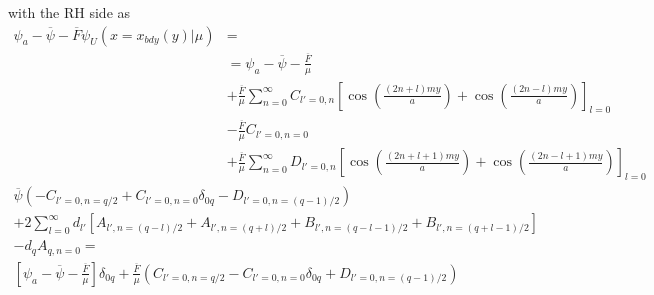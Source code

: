 \documentclass{article}
\begin{document}
with the RH side as
\begin{equation}
    \begin{split}
        \psi_a -\overline{\psi} -\overline{F}\psi_U(x=x_{bdy}(y)|\mu)&= \\
                                                                     &= \psi_a - \overline{\psi} - \frac{\overline{F}}{\mu} \\
                                                                     &+ \frac{\overline{F}}{\mu} \sum_{n=0}^{\infty} C_{l'=0,n} \left[\cos\left( \frac{(2n+l)my}{a} \right) + \cos\left( \frac{(2n-l)my}{a} \right) \right]_{l=0} \\
                                                                     &- \frac{\overline{F}}{\mu} C_{l'=0,n=0} \\
                                                                     &+ \frac{\overline{F}}{\mu} \sum_{n=0}^{\infty} D_{l'=0,n} \left[\cos\left( \frac{(2n+l+1)my}{a} \right) + \cos\left( \frac{(2n-l+1)my}{a} \right) \right]_{l=0}
    \end{split}
\end{equation} 
\begin{equation}
    \begin{split}
        \overline{\psi}\left( -C_{l'=0,n=q / 2} + C_{l'=0,n=0} \delta_{0q} - D_{l'=0,n=(q-1) / 2} \right) \\
        +2 \sum_{l=0}^{\infty} d_{l'} \left[ A_{l',n=(q-l) / 2} + A_{l',n=(q+l) / 2} + B_{l',n=(q-l-1) / 2} + B_{l',n=(q+l-1) / 2} \right] \\
        -d_q A_{q,n=0} = \\
        \left[ \psi_a - \overline{\psi} - \frac{\overline{F}}{\mu} \right] \delta_{0q} + \frac{\overline{F}}{\mu}\left(C_{l'=0,n=q / 2} - C_{l'=0,n=0} \delta_{0q} + D_{l'=0,n=(q-1) / 2}\right) \\
    \end{split}
\end{equation} 
\end{document}
